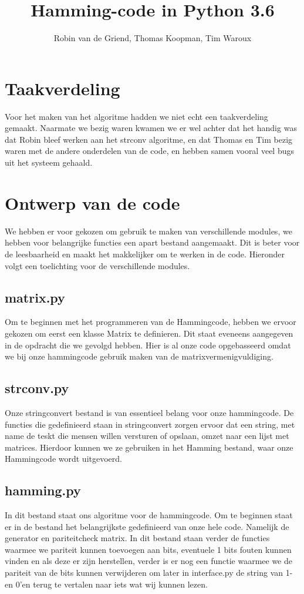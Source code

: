 \documentclass[a4paper]{article}
\begin{document}
\title{Hamming-code in Python 3.6}
\author{Robin van de Griend, Thomas Koopman, Tim Waroux}
\maketitle

\section{Taakverdeling}
Voor het maken van het algoritme hadden we niet echt een taakverdeling gemaakt. Naarmate we bezig waren kwamen we er wel achter dat het handig was dat Robin bleef werken aan het strconv algoritme, en dat Thomas en Tim bezig waren met de andere onderdelen van de code, en hebben samen vooral veel bugs uit het systeem gehaald.

\section{Ontwerp van de code}
We hebben er voor gekozen om gebruik te maken van verschillende modules, we hebben voor belangrijke functies een apart bestand aangemaakt. Dit is beter voor de leesbaarheid en maakt het makkelijker om te werken in de code. Hieronder volgt een toelichting voor de verschillende modules.

\subsection{matrix.py}
	Om te beginnen met het programmeren van de Hammingcode, hebben we ervoor gekozen om eerst een klasse Matrix te definieren. Dit staat eveneens aangegeven in de opdracht die we gevolgd hebben. Hier is al onze code opgebasseerd omdat we bij onze hammingcode gebruik maken van de matrixvermenigvuldiging.

\subsection{strconv.py}
	Onze stringconvert bestand is van essentieel belang voor onze hammingcode. De functies die gedefinieerd staan in stringconvert zorgen ervoor dat een string, met name de teskt die mensen willen versturen of opslaan, omzet naar een lijst met matrices. Hierdoor kunnen we ze gebruiken in het Hamming bestand, waar onze Hammingcode wordt uitgevoerd.

\subsection{hamming.py}
	In dit bestand staat ons algoritme voor de hammingcode. Om te beginnen staat er in de bestand het belangrijkste gedefinieerd van onze hele code. Namelijk de generator en pariteitcheck matrix. In dit bestand staan verder de functies waarmee we pariteit kunnen toevoegen aan bits, eventuele 1 bits fouten kunnen vinden en als deze er zijn herstellen, verder is er nog een functie waarmee we de pariteit van de bits kunnen verwijderen om later in interface.py de string van 1-en 0'en terug te vertalen naar iets wat wij kunnen lezen.
\end{document}
